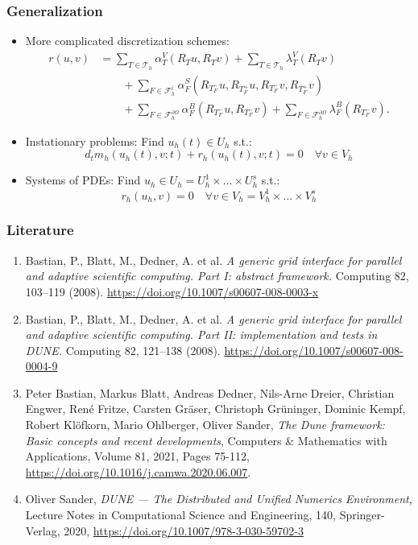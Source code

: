 \documentclass[aspectratio=169,11pt]{beamer}
\theoremstyle{definition}
\begin{document}
\begin{frame}
\frametitle{Generalization}
\begin{itemize}
\item More complicated discretization schemes:
\begin{equation*}
\begin{split}
r(u,v) &=
\sum_{T\in\mathcal{T}_h} \alpha_T^V(R_T u, R_T v)
+ \sum_{T\in\mathcal{T}_h} \lambda_T^V(R_T v) \\
&\qquad+ \sum_{F\in\mathcal{F}_h^i} \alpha_F^S(R_{T_F^-} u,R_{T_F^+} u, R_{T_F^-} v, R_{T_F^+} v)\\
&\qquad+ \sum_{F\in\mathcal{F}_h^{\partial\Omega}} \alpha_F^B(R_{T_F^-} u, R_{T_F^-} v)
+ \sum_{F\in\mathcal{F}_h^{\partial\Omega}} \lambda_F^B(R_{T_F^-} v) .
\end{split}
\end{equation*}
\item Instationary problems: Find $u_h(t)\in U_h$ s.t.:
\begin{equation*}
d_t m_h(u_h(t),v;t) + r_h(u_h(t),v;t) = 0
\quad \forall v\in V_h
\end{equation*}
\item Systems of PDEs: Find $u_h\in U_h=U_h^1\times \ldots \times U_h^s$ s.t.:
\begin{equation*}
r_h(u_h,v)=0
\quad \forall v\in V_h=V_h^1\times\ldots\times V_h^s
\end{equation*}
\end{itemize}
\end{frame}

\begin{frame}
\frametitle{Literature}
\begin{enumerate}
\item Bastian, P., Blatt, M., Dedner, A. et al. \textit{A generic grid interface for parallel and adaptive scientific computing. Part I: abstract framework. }Computing 82, 103–119 (2008). \url{https://doi.org/10.1007/s00607-008-0003-x}
\item Bastian, P., Blatt, M., Dedner, A. et al. \textit{A generic grid interface for parallel and adaptive scientific computing. Part II: implementation and tests in DUNE.} Computing 82, 121–138 (2008). \url{https://doi.org/10.1007/s00607-008-0004-9}
\item Peter Bastian, Markus Blatt, Andreas Dedner, Nils-Arne Dreier, Christian Engwer, René Fritze, Carsten Gräser, Christoph Grüninger, Dominic Kempf, Robert Klöfkorn, Mario Ohlberger, Oliver Sander,
\textit{The Dune framework: Basic concepts and recent developments},
Computers \& Mathematics with Applications,
Volume 81,
2021,
Pages 75-112,
\url{https://doi.org/10.1016/j.camwa.2020.06.007}.
\item Oliver Sander, \textit{DUNE — The Distributed and Unified Numerics Environment},  Lecture Notes in Computational Science and Engineering, 140, Springer-Verlag, 2020, \url{https://doi.org/10.1007/978-3-030-59702-3}
\end{enumerate}
\end{frame}
\end{document}
